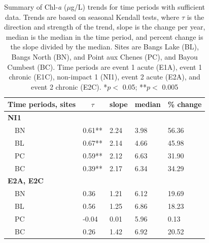 \documentclass[letterpaper,12pt]{article}\usepackage[]{graphicx}\usepackage[]{color}
\begin{document}
\clearpage

\begin{table}[!tbp]
\caption{Summary of Chl-\textit{a} ($\mu$g/L) trends for time periods with sufficient data.  Trends are based on seasonal Kendall tests, where $\tau$ is the direction and strength of the trend, slope is the change per year, median is the median in the time period, and percent change is the slope divided by the median. Sites are Bangs Lake (BL), Bangs North (BN), and Point aux Chenes (PC), and Bayou Cumbest (BC). Time periods are event 1 acute (E1A), event 1 chronic (E1C), non-impact 1 (NI1), event 2 acute (E2A), and event 2 chronic (E2C). *$p <$ 0.05; **$p <$ 0.005\label{tab:CHLA_Ntrnd}} 
\begin{center}
\begin{tabular}{lllll}
\hline\hline
\multicolumn{1}{l}{Time periods, sites}&\multicolumn{1}{c}{$\tau$}&\multicolumn{1}{c}{slope}&\multicolumn{1}{c}{median}&\multicolumn{1}{c}{\% change}\tabularnewline
\hline
{\bfseries NI1}&&&&\tabularnewline
~~BN&0.61**&2.24&3.98&56.36\tabularnewline
~~BL&0.67**&2.14&4.66&45.98\tabularnewline
~~PC&0.59**&2.12&6.63&31.90\tabularnewline
~~BC&0.39**&2.17&6.34&34.29\tabularnewline
\hline
{\bfseries E2A, E2C}&&&&\tabularnewline
~~BN&0.36&1.21&6.12&19.69\tabularnewline
~~BL&0.56&1.25&6.86&18.23\tabularnewline
~~PC&-0.04&0.01&5.96&0.13\tabularnewline
~~BC&0.26&1.42&6.92&20.52\tabularnewline
\hline
\end{tabular}\end{center}
\end{table}
\end{document}
